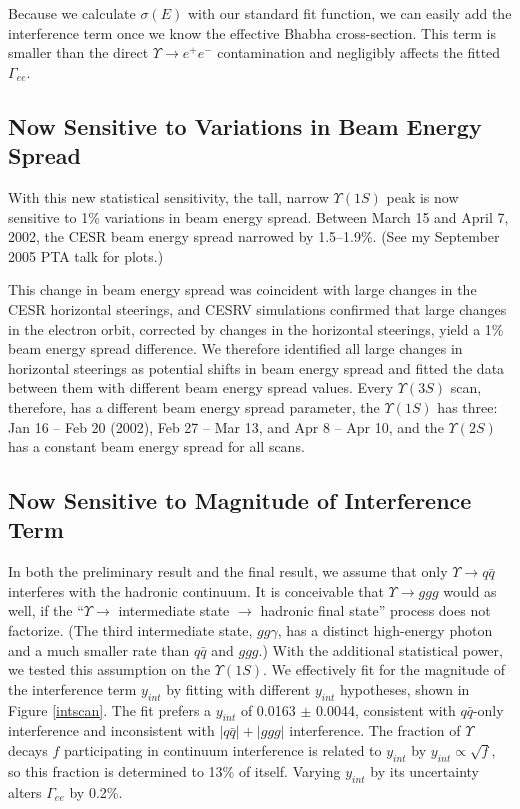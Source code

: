 \documentclass[12pt]{article}
\begin{document}
Because we calculate $\sigma(E)$ with our standard fit function, we
can easily add the interference term once we know the effective Bhabha
cross-section.  This term is smaller than the direct $\Upsilon \to
e^+e^-$ contamination and negligibly affects the fitted $\Gamma_{ee}$.

\subsection{Now Sensitive to Variations in Beam Energy Spread}

With this new statistical sensitivity, the tall, narrow $\Upsilon(1S)$
peak is now sensitive to 1\% variations in beam energy spread.
Between March 15 and April 7, 2002, the CESR beam energy spread
narrowed by 1.5--1.9\%.  (See my September 2005 PTA talk for plots.)

This change in beam energy spread was coincident with large changes in
the CESR horizontal steerings, and CESRV simulations confirmed that
large changes in the electron orbit, corrected by changes in the
horizontal steerings, yield a 1\% beam energy spread difference.  We
therefore identified all large changes in horizontal steerings as
potential shifts in beam energy spread and fitted the data between
them with different beam energy spread values.  Every $\Upsilon(3S)$
scan, therefore, has a different beam energy spread parameter, the
$\Upsilon(1S)$ has three: Jan 16 -- Feb 20 (2002), Feb 27 -- Mar 13,
and Apr 8 -- Apr 10, and the $\Upsilon(2S)$ has a constant beam energy
spread for all scans.

\subsection{Now Sensitive to Magnitude of Interference Term}

In both the preliminary result and the final result, we assume that
only $\Upsilon \to q\bar{q}$ interferes with the hadronic continuum.
It is conceivable that $\Upsilon \to ggg
$ would as well, if the
``$\Upsilon \to$ intermediate state $\to$ hadronic final state'' process
does not factorize.  (The third intermediate state, $gg\gamma$, has a
distinct high-energy photon and a much smaller rate than $q\bar{q}$
and $ggg$.)  With the additional statistical power, we tested this
assumption on the $\Upsilon(1S)$.  We effectively fit for the
magnitude of the interference term $y_{int}$ by fitting with different
$y_{int}$ hypotheses, shown in Figure \ref{intscan}.  The fit prefers
a $y_{int}$ of 0.0163 $\pm$ 0.0044, consistent with $q\bar{q}$-only
interference and inconsistent with $|q\bar{q}| + |ggg|$ interference.  The
fraction of $\Upsilon$ decays $f$ participating in continuum interference
is related to $y_{int}$ by $y_{int} \propto \sqrt{f}$, so this
fraction is determined to 13\% of itself.  Varying $y_{int}$ by its
uncertainty alters $\Gamma_{ee}$ by 0.2\%.
\end{document}
